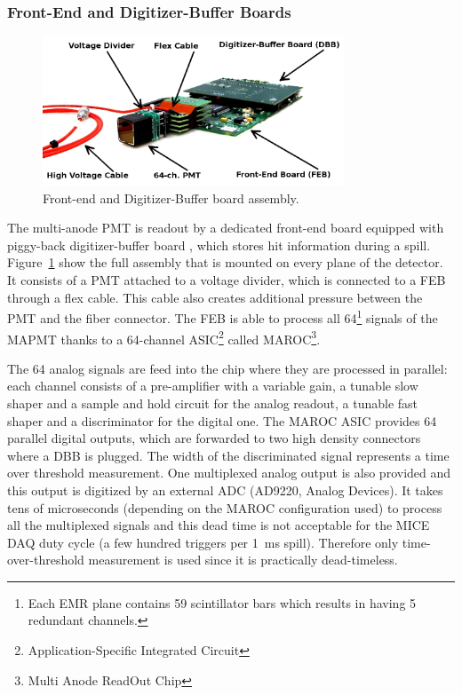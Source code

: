 \documentclass[a4paper,11pt]{article}
\begin{document}
\subsubsection{Front-End and Digitizer-Buffer Boards}
\begin{figure}[htp!]
 \centering
 \includegraphics[width=0.8\textwidth]{./feb_dbb}
 \caption[Front-end and buffer board assembly]{Front-end and Digitizer-Buffer board assembly.}
 \label{fig:feb_dbb}
\end{figure}

The multi-anode PMT is readout by a dedicated front-end board equipped with piggy-back digitizer-buffer board \cite{Bolognini2011108}, which stores
hit information during a spill. Figure~\ref{fig:feb_dbb} show the full assembly that is mounted on every plane of the detector. It consists of a PMT
attached to a voltage divider, which is connected to a FEB through a flex cable. This cable also creates additional pressure between the PMT and
the fiber connector. The FEB is able to process all 64\footnote{Each EMR plane contains 59 scintillator bars which results in having 5 redundant
channels.} signals of the MAPMT thanks to a 64-channel ASIC\footnote{Application-Specific Integrated Circuit} called MAROC\footnote{Multi Anode
ReadOut Chip}\cite{maroc}.

The 64 analog signals are feed into the chip where they are processed in parallel: each channel consists of a pre-amplifier with a variable gain,
a tunable slow shaper and a sample and hold circuit for the analog readout, a tunable fast shaper and a discriminator for the digital one.
The MAROC ASIC provides 64 parallel digital outputs, which are forwarded to two high density connectors where a DBB is plugged. The width of the
discriminated signal represents a time over threshold measurement. One multiplexed analog output is also provided and this output is digitized by
an external ADC (AD9220, Analog Devices). It takes tens of microseconds (depending on the MAROC configuration used) to process all the multiplexed signals
and this dead time is not acceptable for the MICE DAQ duty cycle (a few hundred triggers per 1~ms spill). Therefore only time-over-threshold
measurement is used since it is practically dead-timeless.
\end{document}
